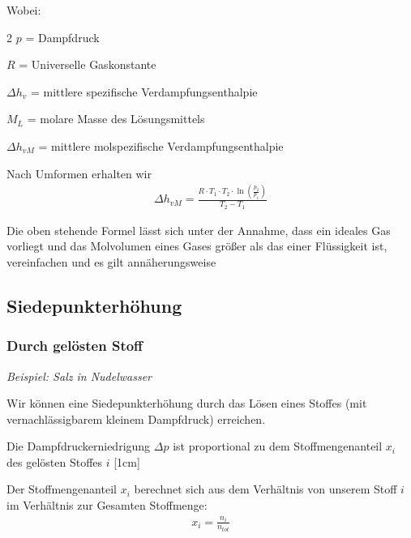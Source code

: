\documentclass[a4paper,10pt,twoside]{article}
\begin{document}
Wobei: \par
\begin{multicols}{2}
$p$ = Dampfdruck \par 
$R$ = Universelle Gaskonstante \par 
$\Delta h_v$ = mittlere spezifische Verdampfungsenthalpie \par 
$M_L$ = molare Masse des Lösungsmittels \par 
$\Delta h_{vM}$ = mittlere molspezifische Verdampfungsenthalpie
\end{multicols}
\pp
Nach Umformen erhalten wir
\begin{align*}
\Delta h_{vM} = \frac{R \cdot T_1 \cdot T_2 \cdot \ln(\frac{p_2}{p_1})}{T_2 - T_1}
\end{align*}

Die oben stehende Formel lässt sich unter der Annahme, dass ein ideales Gas vorliegt und das Molvolumen eines Gases größer als das einer Flüssigkeit ist, vereinfachen und es gilt annäherungsweise\par 
{}


\subsection{Siedepunkterhöhung}
\subsubsection{Durch gelösten Stoff} 
\textit{Beispiel: Salz in Nudelwasser} \par 
Wir können eine Siedepunkterhöhung durch das Lösen eines Stoffes (mit vernachlässigbarem kleinem Dampfdruck) erreichen. \par Die Dampfdruckerniedrigung $\Delta p$ ist proportional zu dem Stoffmengenanteil $x_i$ des gelösten Stoffes $i$
\reversemarginpar
{}[1cm]
\pp
{}
\par \vspace*{2mm}
\color{miudiutex}

Der Stoffmengenanteil $x_i$ berechnet sich aus dem Verhältnis von unserem Stoff $i$ im Verhältnis zur Gesamten Stoffmenge:
\begin{align*}
x_i = \frac{n_i}{n_{tot}}
\end{align*}
\end{document}
